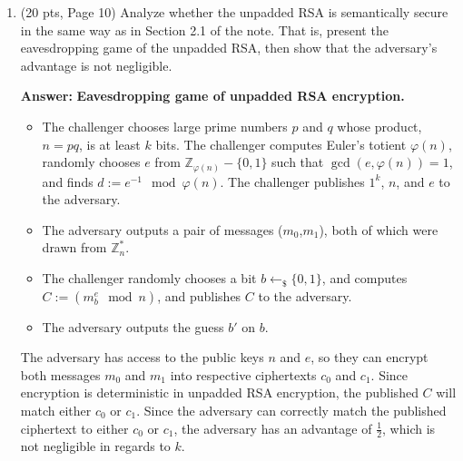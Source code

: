 \documentclass[10pt]{article}
\begin{document}
\begin{enumerate}
	\bigskip\item (20 pts, Page 10) Analyze whether the unpadded RSA is semantically secure in the same way as in Section 2.1 of the note. That is, present the eavesdropping game of the unpadded RSA, then show that the adversary's advantage is not negligible.
    
    \textbf{Answer:} \newline \textbf{Eavesdropping game of unpadded RSA encryption.}
    \begin{itemize}
        \item The challenger chooses large prime numbers $p$ and $q$ whose product, $n=pq$, is at least $k$ bits. The challenger computes Euler's totient $\varphi(n)$, randomly chooses $e$ from $\mathbb{Z}_{\varphi(n)}-\{0,1\}$ such that $\gcd(e,\varphi(n))=1$, and finds $d:=e^{-1}\mod \varphi(n)$. The challenger publishes $1^k$, $n$, and $e$ to the adversary.
        \item The adversary outputs a pair of messages ($m_0$,$m_1$), both of which were drawn from $\mathbb{Z}_{n}^{*}$.
        \item The challenger randomly chooses a bit $b\leftarrow_{\$}\{0,1\}$, and computes $C:=(m_{b}^e\mod n)$, and publishes $C$ to the adversary.
        \item The adversary outputs the guess $b'$ on $b$.
    \end{itemize}
    The adversary has access to the public keys $n$ and $e$, so they can encrypt both messages $m_0$ and $m_1$ into respective ciphertexts $c_0$ and $c_1$. Since encryption is deterministic in unpadded RSA encryption, the published $C$ will match either $c_0$ or $c_1$. Since the adversary can correctly match the published ciphertext to either $c_0$ or $c_1$, the adversary has an advantage of $\frac{1}{2}$, which is not negligible in regards to $k$. 
    
\end{enumerate}
\end{document}
